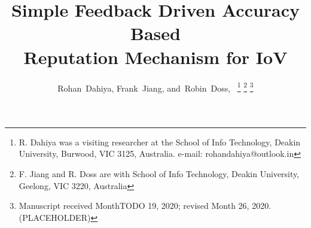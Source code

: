 \documentclass[journal]{IEEEtran}
\begin{document}
%
\title{Simple Feedback Driven Accuracy Based\\ Reputation Mechanism for IoV}
%
%
%
\author{Rohan~Dahiya,
        Frank~Jiang,
        and~Robin~Doss,~%
\thanks{R. Dahiya was a visiting researcher at the School of Info Technology, Deakin University, Burwood, VIC 3125, Australia. e-mail: rohandahiya@outlook.in}%
\thanks{F. Jiang and R. Doss are with School of Info Technology, Deakin University, Geelong, VIC 3220, Australia}%
\thanks{Manuscript received MonthTODO 19, 2020; revised Month 26, 2020.(PLACEHOLDER)}}

% 
%
\end{document}
